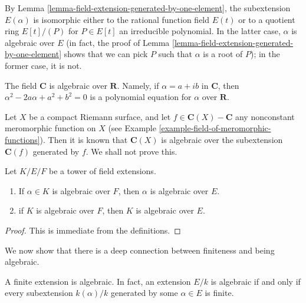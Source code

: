 \noindent
By Lemma \ref{lemma-field-extension-generated-by-one-element}, the
subextension $E(\alpha)$ is isomorphic either to the rational function
field $E(t)$ or to a quotient ring $E[t]/(P)$ for $P \in E[t]$ an
irreducible polynomial. In the latter case, $\alpha$ is algebraic over
$E$ (in fact, the proof of
Lemma \ref{lemma-field-extension-generated-by-one-element}
shows that we can pick $P$ such that $\alpha$ is a root of $P$);
in the former case, it is not.

\begin{example}
\label{example-C-algebraic-over-R}
The field $\mathbf{C}$ is algebraic over $\mathbf{R}$. Namely, if
$\alpha = a + ib$ in $\mathbf{C}$, then $\alpha^2 - 2a\alpha + a^2 + b^2 = 0$
is a polynomial equation for $\alpha$ over $\mathbf{R}$.
\end{example}

\begin{example}
\label{example-compact-riemann-surface-is-finite-over-P1}
Let $X$ be a compact Riemann surface, and let
$f \in \mathbf{C}(X) - \mathbf{C}$ any nonconstant meromorphic function
on $X$ (see Example \ref{example-field-of-meromorphic-functions}). Then it is
known that $\mathbf{C}(X)$ is algebraic over the subextension
$\mathbf{C}(f)$ generated by $f$. We shall not prove this.
\end{example}

\begin{lemma}
\label{lemma-algebraic-goes-up}
Let $K/E/F$ be a tower of field extensions.
\begin{enumerate}
\item If $\alpha \in K$ is algebraic over $F$, then $\alpha$ is algebraic
over $E$.
\item if $K$ is algebraic over $F$, then $K$ is algebraic over $E$.
\end{enumerate}
\end{lemma}

\begin{proof}
This is immediate from the definitions.
\end{proof}

\noindent
We now show that there is a deep connection between finiteness and being
algebraic.

\begin{lemma}
\label{lemma-finite-is-algebraic}
A finite extension is algebraic. In fact, an extension $E/k$ is algebraic
if and only if every subextension $k(\alpha)/k$ generated by some
$\alpha \in E$ is finite.
\end{lemma}


